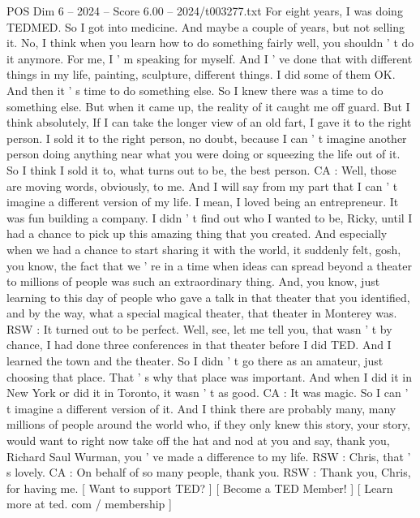 \begin{textsample}{POS Dim 6 – 2024 – Score 6.00 – 2024/t003277.txt}
For eight years, I was doing TEDMED.
So I got into medicine.
And maybe a couple of years, but not selling it.
No, I think when you learn how to do something fairly well, you shouldn ' t do it anymore.
For me, I ' m speaking for myself.
And I ' ve done that with different things in my life, painting, sculpture, different things.
I did some of them OK.
And then it ' s time to do something else.
So I knew there was a time to do something else.
But when it came up, the reality of it caught me off guard.
But I think absolutely, If I can take the longer view of an old fart, I gave it to the right person.
I sold it to the right person, no doubt, because I can ' t imagine another person doing anything near what you were doing or squeezing the life out of it.
So I think I sold it to, what turns out to be, the best person.
CA : Well, those are moving words, obviously, to me.
And I will say from my part that I can ' t imagine a different version of my life.
I mean, I loved being an entrepreneur.
It was fun building a company.
I didn ' t find out who I wanted to be, Ricky, until I had a chance to pick up this amazing thing that you created.
And especially when we had a chance to start sharing it with the world, it suddenly felt, gosh, you know, the fact that we ' re in a time when ideas can spread beyond a theater to millions of people was such an extraordinary thing.
And, you know, just learning to this day of people who gave a talk in that theater that you identified, and by the way, what a special magical theater, that theater in Monterey was.
RSW : It turned out to be perfect.
Well, see, let me tell you, that wasn ' t by chance, I had done three conferences in that theater before I did TED.
And I learned the town and the theater.
So I didn ' t go there as an amateur, just choosing that place.
That ' s why that place was important.
And when I did it in New York or did it in Toronto, it wasn ' t as good.
CA : It was magic.
So I can ' t imagine a different version of it.
And I think there are probably many, many millions of people around the world who, if they only knew this story, your story, would want to right now take off the hat and nod at you and say, thank you, Richard Saul Wurman, you ' ve made a difference to my life.
RSW : Chris, that ' s lovely.
CA : On behalf of so many people, thank you.
RSW : Thank you, Chris, for having me. [ Want to support TED? ] [ Become a TED Member! ] [ Learn more at ted. com / membership ]

\end{textsample}
